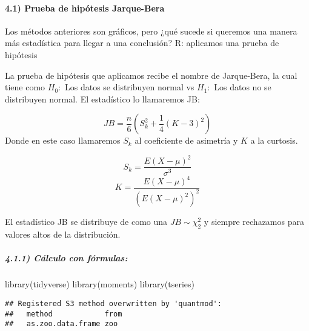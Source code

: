 \documentclass[
]{article}
\newenvironment{Shaded}{\begin{snugshade}}{\end{snugshade}}
\newcommand{\FunctionTok}[1]{\textcolor[rgb]{0.00,0.00,0.00}{#1}}
\newcommand{\NormalTok}[1]{#1}
\begin{document}
\hypertarget{prueba-de-hipuxf3tesis-jarque-bera}{%
\paragraph{4.1) Prueba de hipótesis
Jarque-Bera}\label{prueba-de-hipuxf3tesis-jarque-bera}}

Los métodos anteriores son gráficos, pero ¿qué sucede si queremos una
manera más estadística para llegar a una conclusión? R: aplicamos una
prueba de hipótesis

La prueba de hipótesis que aplicamos recibe el nombre de Jarque-Bera, la
cual tiene como \(H_0:\) Los datos se distribuyen normal vs \(H_1:\) Los
datos no se distribuyen normal. El estadístico lo llamaremos JB:

\[ JB = \frac{n}{6}( S_k^2 +\frac{1}{4}(K-3)^2) \] Donde en este caso
llamaremos \(S_k\) al coeficiente de asimetría y \(K\) a la curtosis.

\[ S_k = \frac{E(X-\mu)^2}{\sigma^3}\]
\[ K = \frac{E(X-\mu)^4}{(E(X-\mu)^2)^2}\]

El estadístico JB se distribuye de como una \(JB \sim \chi^2_{2}\) y
siempre rechazamos para valores altos de la distribución.

\hypertarget{cuxe1lculo-con-fuxf3rmulas}{%
\subparagraph{4.1.1) Cálculo con
fórmulas:}\label{cuxe1lculo-con-fuxf3rmulas}}

\begin{Shaded}
\begin{Highlighting}[]
\FunctionTok{library}\NormalTok{(tidyverse)}
\FunctionTok{library}\NormalTok{(moments)}
\FunctionTok{library}\NormalTok{(tseries)}
\end{Highlighting}
\end{Shaded}

\begin{verbatim}
## Registered S3 method overwritten by 'quantmod':
##   method            from
##   as.zoo.data.frame zoo
\end{verbatim}
\end{document}
